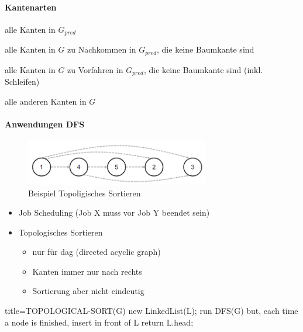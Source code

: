 \documentclass[
    ngerman,
    color=3b,
    dark_mode,
    load_common, %
    summary,
    boxarc,
]{tuda_summary}
\begin{document}
\paragraph{Kantenarten}
\begin{description}[leftmargin=3cm]
    \item [Baumkanten] alle Kanten in $G_{pred}$
    \item [Vorwärtskanten] alle Kanten in $G$ zu Nachkommen in $G_{pred}$, die keine Baumkante sind
    \item [Rückwärtskanten] alle Kanten in $G$ zu Vorfahren in $G_{pred}$, die keine Baumkante sind (inkl. Schleifen)
    \item [Kreuzkanten] alle anderen Kanten in $G$
\end{description}

\paragraph{Anwendungen DFS}
\begin{figure}
    \centering
    \includegraphics[width=8cm]{pictures/topo.PNG}
    \caption{Beispiel Topoligisches Sortieren}
\end{figure}
\begin{itemize}
    \item Job Scheduling (Job X muss vor Job Y beendet sein)
    \item Topologisches Sortieren
          \begin{itemize}
              \item nur für dag (directed acyclic graph)
              \item Kanten immer nur nach rechts
              \item Sortierung aber nicht eindeutig
          \end{itemize}
\end{itemize}

\begin{codeBlock}[autogobble]{title={TOPOLOGICAL-SORT(G)}}
    new LinkedList(L);
    run DFS(G) but, each time a node is finished, insert in front of L
    return L.head;
\end{codeBlock}
\end{document}
